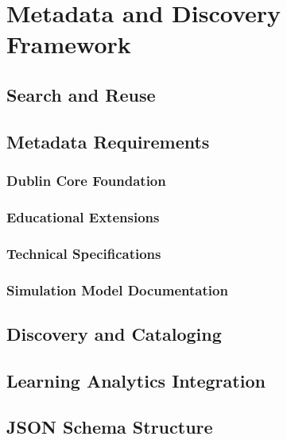 \section{Metadata and Discovery Framework}
\label{sec:metadata}


\subsection{Search and Reuse}

\subsection{Metadata Requirements}

\subsubsection{Dublin Core Foundation}

\subsubsection{Educational Extensions}

\subsubsection{Technical Specifications}

\subsubsection{Simulation Model Documentation}

\subsection{Discovery and Cataloging}

\subsection{Learning Analytics Integration}

\subsection{JSON Schema Structure}
